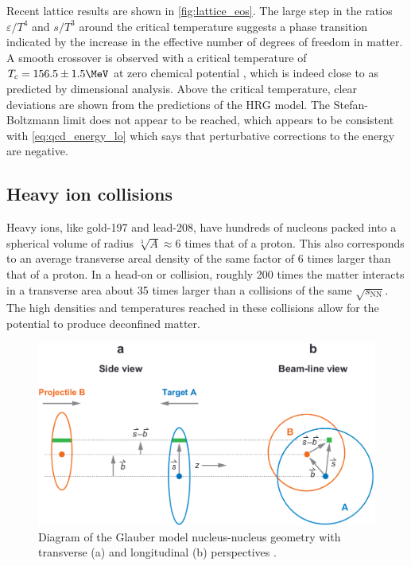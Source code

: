 Recent lattice \qcd results are shown in \cref{fig:lattice_eos}.
The large step in the ratios $\varepsilon/T^4$ and $s/T^3$ around the critical temperature suggests a phase transition indicated by the increase in the effective number of degrees of freedom in \qcd matter.
A smooth crossover is observed with a critical temperature of \( T_c = 156.5 \pm 1.5 \MeV \) at zero chemical potential \cite{Bazavov:2018mes}, which is indeed close to \lqcd as predicted by dimensional analysis.
Above the critical temperature, clear deviations are shown from the predictions of the \ac{HRG} model.
The Stefan-Boltzmann limit does not appear to be reached, which appears to be consistent with \cref{eq:qcd_energy_lo} which says that perturbative corrections to the energy are negative.


\subsection{Heavy ion collisions}

Heavy ions, like gold-197 and lead-208, have hundreds of nucleons packed into a spherical volume of radius $\sqrt[3]{A} \approx 6$ times that of a proton.
This also corresponds to an average transverse areal density of the same factor of 6 times larger than that of a proton.
In a head-on \AuAu or \PbPb collision, roughly 200 times the matter interacts in a transverse area about 35 times larger than a \pp collisions of the same $\sqrt{s_\mathrm{NN}}$.
The high densities and temperatures reached in these collisions allow for the potential to produce deconfined \qgp matter.

\begin{figure}[t]
  \includegraphics{hi_collision_geo.png}
  \caption{Diagram of the Glauber model nucleus-nucleus geometry with transverse (a) and longitudinal (b) perspectives \cite{Miller:2007ri}.}
  \label{fig:hi_collision_geo}
\end{figure}

